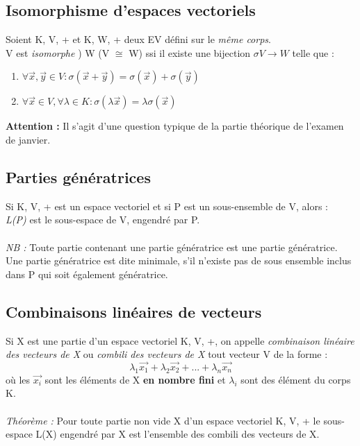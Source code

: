 \documentclass[12pt, a4paper, openany]{article}
\begin{document}
\subsection{Isomorphisme d'espaces vectoriels}
Soient K, V, + et K, W, + deux EV défini sur le \textit{même corps}.\\
V est \textit{isomorphe} ) W (V $\cong $ W) ssi il existe une bijection $\sigma V \rightarrow W$ telle que : 
\begin{enumerate}
\item $\forall \vec{x}, \vec{y} \in V : \sigma(\vec{x} + \vec{y}) = \sigma(\vec{x}) + \sigma(\vec{y})$
\item $\forall \vec{x} \in V, \forall \lambda \in K : \sigma(\lambda\vec{x}) = \lambda\sigma(\vec{x})$
\end{enumerate}
\textbf{Attention :} Il s'agit d'une question typique de la partie théorique de l'examen de janvier.

\subsection{Parties génératrices}
Si K, V, + est un espace vectoriel et si P est un sous-ensemble de V, alors :\\
\textit{L(P)} est le sous-espace de V, engendré par P.\\\\
\textit{NB :} Toute partie contenant une partie génératrice est une partie génératrice. Une partie génératrice est dite minimale, s'il n'existe pas de sous ensemble inclus dans P qui soit également génératrice.

\subsection{Combinaisons linéaires de vecteurs}
Si X est une partie d'un espace vectoriel K, V, +, on appelle \textit{combinaison linéaire des vecteurs de X} ou \textit{combili des vecteurs de X} tout vecteur V de la forme :
$$\lambda_{1}\vec{x_{1}} + \lambda_{2}\vec{x_{2}} + ... + \lambda_{n}\vec{x_{n}}$$
où les $\vec{x_{i}}$ sont les éléments de X \textbf{en nombre fini} et $\lambda_{i}$ sont des élément du corps K.\\\\
\textit{Théorème :} Pour toute partie non vide X d'un espace vectoriel K, V, + le sous-espace L(X) engendré par X est l'ensemble des combili des vecteurs de X.
\end{document}
